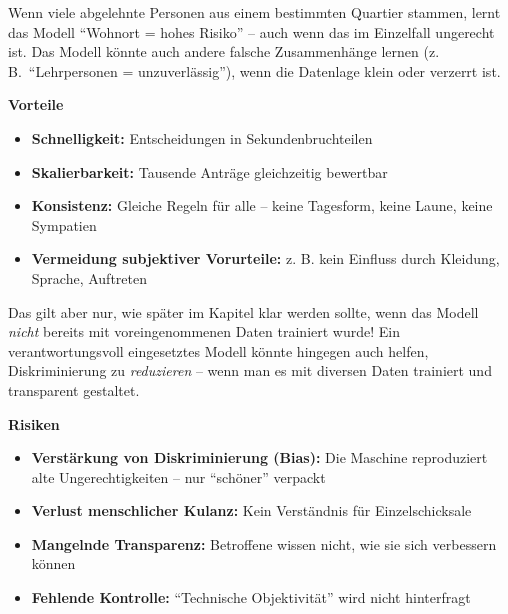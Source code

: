 \begin{aufgabe}{1}
\begin{itemize}
\end{itemize}

Wenn viele abgelehnte Personen aus einem bestimmten Quartier stammen, lernt das Modell ``Wohnort = hohes Risiko'' – auch wenn das im Einzelfall ungerecht ist. Das Modell könnte auch andere falsche Zusammenhänge lernen (z.\,B.\ ``Lehrpersonen = unzuverlässig''), wenn die Datenlage klein oder verzerrt ist.

\vspace{0.5em}
\textbf{Vorteile}

\begin{itemize}
  \item \textbf{Schnelligkeit:} Entscheidungen in Sekundenbruchteilen
  \item \textbf{Skalierbarkeit:} Tausende Anträge gleichzeitig bewertbar
  \item \textbf{Konsistenz:} Gleiche Regeln für alle – keine Tagesform, keine Laune, keine Sympatien
  \item \textbf{Vermeidung subjektiver Vorurteile:} z. B. kein Einfluss durch Kleidung, Sprache, Auftreten

\end{itemize}

Das gilt aber nur, wie später im Kapitel klar werden sollte, wenn das Modell \emph{nicht} bereits mit voreingenommenen Daten trainiert wurde! Ein verantwortungsvoll eingesetztes Modell könnte hingegen auch helfen, Diskriminierung zu \emph{reduzieren} – wenn man es mit diversen Daten trainiert und transparent gestaltet.

\vspace{0.5em}
\textbf{Risiken}

\begin{itemize}
  \item \textbf{Verstärkung von Diskriminierung (Bias):} Die Maschine reproduziert alte Ungerechtigkeiten – nur ``schöner'' verpackt
  \item \textbf{Verlust menschlicher Kulanz:} Kein Verständnis für Einzelschicksale
  \item \textbf{Mangelnde Transparenz:} Betroffene wissen nicht, wie sie sich verbessern können
  \item \textbf{Fehlende Kontrolle:} ``Technische Objektivität'' wird nicht hinterfragt

\end{itemize}

\end{aufgabe}


